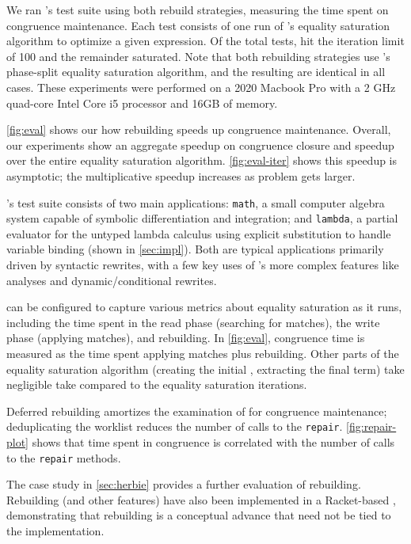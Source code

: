 We ran \egg's test suite using both rebuild strategies, measuring the time spent
  on congruence maintenance.
Each test consists of one run of \egg's equality saturation algorithm to optimize
  a given expression.
Of the \nEggTests total tests,
  \nEggTimeouts hit the iteration limit of 100 and the remainder saturated.
Note that both rebuilding strategies use \egg's phase-split equality saturation
  algorithm, and the resulting \egraphs are identical in all cases.
These experiments were performed on a 2020 Macbook Pro with a 2 GHz quad-core
  Intel Core i5 processor and 16GB of memory.

\autoref{fig:eval} shows our how rebuilding speeds up congruence maintenance.
Overall, our experiments show an aggregate \CongrSpeedup speedup on congruence
  closure and \TotalSpeedup speedup over the entire equality saturation
  algorithm.
\autoref{fig:eval-iter} shows this speedup is asymptotic;
  the multiplicative speedup increases as problem gets larger.

\egg's test suite consists of two main applications:
\texttt{math},
  a small computer algebra system capable of symbolic differentiation and
  integration; and
\texttt{lambda},
  a partial evaluator for the untyped lambda calculus using explicit
  substitution to handle variable binding (shown in \autoref{sec:impl}).
Both are typical \egg applications primarily driven by
  syntactic rewrites, with a few key uses of \egg's more complex features
  like \eclass analyses and dynamic/conditional rewrites.

\egg can be configured to capture various metrics about equality saturation as
  it runs, including the time spent in the read phase (searching for matches),
  the write phase (applying matches), and rebuilding.
In \autoref{fig:eval}, congruence time is measured as the time spent
  applying matches plus rebuilding.
Other parts of the equality saturation algorithm (creating the initial \egraph,
  extracting the final term) take negligible take compared to the equality
  saturation iterations.

Deferred rebuilding amortizes the examination of \eclasses
  for congruence maintenance;
  deduplicating the worklist reduces the number of calls to the \texttt{repair}.
\autoref{fig:repair-plot} shows that time spent in congruence is correlated with
  the number of calls to the \texttt{repair} methods.

The case study in \autoref{sec:herbie} provides a further evaluation of
  rebuilding. Rebuilding (and other \egg features) have also been implemented in
  a Racket-based \egraph, demonstrating that rebuilding is a conceptual advance
  that need not be tied to the \egg implementation.

